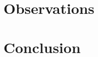 \documentclass[12pt]{article}
\begin{document}
\clearpage

\section{Observations}

\section{Conclusion}


%
%

\end{document}
